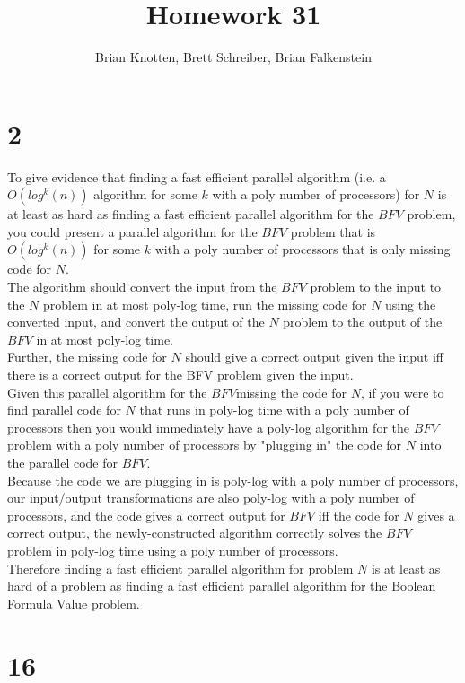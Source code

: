 \documentclass[letterpaper,notitlepage,twoside]{article}
\begin{document}
\title{Homework 31}
\author{Brian Knotten, Brett Schreiber, Brian Falkenstein}
\maketitle

\section*{2}
To give evidence that finding a fast efficient parallel algorithm (i.e. a $O(log^k(n))$ algorithm for some $k$ with a poly number of processors) for $N$ is at least as hard as finding a fast efficient parallel algorithm for the $BFV$ problem, you could present a parallel algorithm for the $BFV$ problem that is $O(log^k(n))$ for some $k$ with a poly number of processors that is only missing code for $N$. \\
The algorithm should convert the input from the $BFV$ problem to the input to the $N$ problem in at most poly-log time, run the missing code for $N$ using the converted input, and convert the output of the $N$ problem to the output of the $BFV$ in at most poly-log time. \\
Further, the missing code for $N$ should give a correct output given the input iff there is a correct output for the BFV problem given the input. \\
Given this parallel algorithm for the $BFV$missing the code for $N$, if you were to find parallel code for $N$ that runs in poly-log time with a poly number of processors then you would immediately have a poly-log algorithm for the $BFV$ problem with a poly number of processors by "plugging in" the code for $N$ into the parallel code for $BFV$. \\
Because the code we are plugging in is poly-log with a poly number of processors, our input/output transformations are also poly-log with a poly number of processors, and the code gives a correct output for $BFV$ iff the code for $N$ gives a correct output, the newly-constructed algorithm correctly solves the $BFV$ problem in poly-log time using a poly number of processors. \\
Therefore finding a fast efficient parallel algorithm for problem $N$ is at least as hard of a problem as finding a fast efficient parallel algorithm for the Boolean Formula Value problem. \\

\section*{16}
\end{document}
